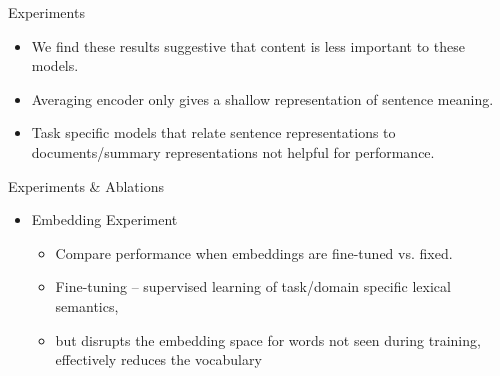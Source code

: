 \begin{frame}{Experiments}
    \begin{itemize}
        \item We find these results suggestive that content is less important to these models.
            \vspace{10pt}
        \item Averaging encoder only gives a shallow representation of sentence meaning.
            \vspace{10pt}
        \item Task specific models that relate sentence representations to 
            documents/summary representations not helpful for performance.

    \end{itemize}
\end{frame}


\begin{frame}{Experiments \& Ablations}
    \begin{itemize}
    \item Embedding Experiment
    \begin{itemize}
        \item Compare performance when embeddings are fine-tuned vs. fixed.
        \item Fine-tuning -- supervised learning of task/domain specific 
            lexical semantics, 
        \item but disrupts the embedding space for words not seen during training, effectively reduces the vocabulary
        
    \end{itemize}
\end{itemize}

\end{frame}

